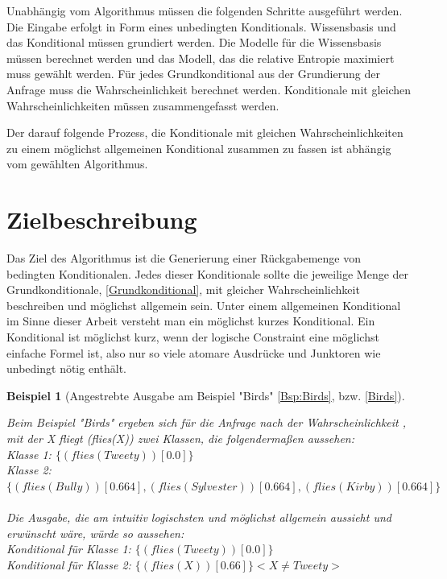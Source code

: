 \documentclass[a4paper, 11pt]{book}
\newtheorem{Bsp}{Beispiel}[section]
\begin{document}
Unabhängig vom Algorithmus müssen die folgenden Schritte ausgeführt werden. Die Eingabe erfolgt in Form eines unbedingten Konditionals. Wissensbasis und das Konditional müssen grundiert werden. Die Modelle für die Wissensbasis müssen berechnet werden und das Modell, das die relative Entropie maximiert muss gewählt werden. Für jedes Grundkonditional   aus der Grundierung der Anfrage muss die Wahrscheinlichkeit berechnet werden. Konditionale mit gleichen Wahrscheinlichkeiten müssen zusammengefasst werden. 

Der darauf folgende Prozess, die Konditionale mit gleichen Wahrscheinlichkeiten zu einem möglichst allgemeinen Konditional zusammen zu fassen ist abhängig vom gewählten Algorithmus.

\section{Zielbeschreibung} \label{Zielbeschreibung}                                                                                                                                                                   
Das Ziel des Algorithmus ist die Generierung einer Rückgabemenge von bedingten Konditionalen. Jedes dieser Konditionale sollte die jeweilige Menge der Grundkonditionale, \ref{Grundkonditional}, mit gleicher Wahrscheinlichkeit beschreiben und möglichst allgemein sein. Unter einem allgemeinen Konditional im Sinne dieser Arbeit versteht man ein möglichst kurzes Konditional. Ein Konditional ist möglichst kurz, wenn der logische Constraint eine möglichst einfache Formel ist, also nur so viele atomare Ausdrücke und Junktoren wie unbedingt nötig enthält.


\begin{Bsp}[Angestrebte Ausgabe am Beispiel "{}Birds"{} \ref{Bsp:Birds}, bzw.  \ref{Birds}]
	\label{Ausgabe_Birds}

	Beim Beispiel "{}Birds"{} ergeben sich für die Anfrage nach der Wahrscheinlichkeit , mit der X fliegt (flies(X)) zwei Klassen, die folgendermaßen aussehen:\\
	
	\noindent
			Klasse 1: $\{(flies(Tweety))[0.0]\}$\\
			Klasse 2: $\{(flies(Bully))[0.664], (flies(Sylvester))[0.664], (flies(Kirby))[0.664]\}$\\
			\\
			Die Ausgabe, die am intuitiv logischsten und möglichst allgemein aussieht und erwünscht wäre, würde so aussehen:\\
				Konditional für Klasse 1: $\{(flies(Tweety))[0.0]\}$\\
				Konditional für Klasse 2: $\{(flies(X))[0.66]\} <X \neq Tweety>$\\
\end{Bsp}
\end{document}
